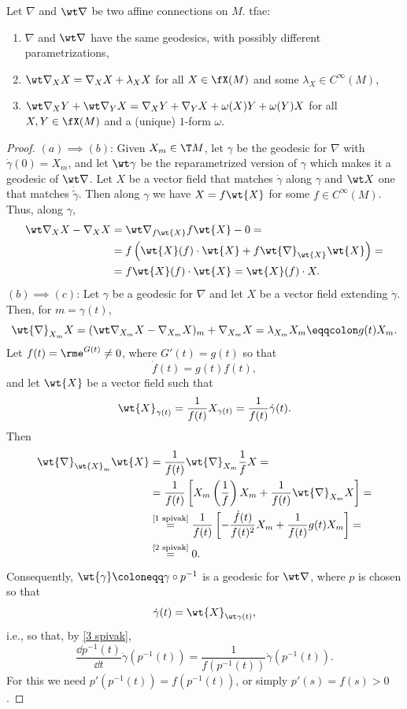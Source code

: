 \begin{prop}
    Let $\nabla$ and $\wt\nabla$ be two affine connections on $M$. \gls{tfae}:
    \begin{enumerate}[label=(\alph*)]
        \item $\nabla$ and $\wt\nabla$ have the same geodesics, with possibly different parametrizations,
        \item $\wt\nabla_X X=\nabla_X X+\lambda_X X$ for all $X\in \fX(M)$ and some $\lambda_X\in C^\infty(M)$,
        \item $\wt\nabla_X Y+\wt\nabla_Y X=\nabla_X Y+\nabla_Y X+\omega(X)Y+\omega(Y)X$ for all $X,Y\in\fX(M)$ and a (unique) $1$-form $\omega$.
    \end{enumerate}    
\end{prop}
\begin{proof}
    $(a)\implies(b)$: Given $X_m\in \T M$, let $\gamma$  be the geodesic for $\nabla$ with $\dot\gamma(0)=X_m$, and let $\wt\gamma$ be the reparametrized version of $\gamma$ which makes it a geodesic of $\wt\nabla$. Let $X$ be a vector field that matches $\dot\gamma$ along $\gamma$ and $\wt X$ one that matches $\dot{\tilde\gamma}$. Then along $\gamma$ we have $X=f\wt{X}$ for some $f\in C^\infty(M)$. Thus, along $\gamma$,
    \begin{align}
        \wt\nabla_X X-\nabla_X X&= \wt\nabla_{f\wt{X}}f\wt{X}-0=\notag\\
        &= f\left(\wt{X}(f)\cdot \wt{X}+f\wt{\nabla}_{\wt{X}}\wt{X}\right)=\notag\\
        &= f\wt{X}(f)\cdot \wt{X}=\wt{X}(f)\cdot X.
    \end{align}
    $(b)\implies(c)$: Let $\gamma$ be a geodesic for $\nabla$ and let $X$ be a vector field extending $\dot\gamma$. Then, for $m=\gamma(t)$,
    \[\wt{\nabla}_{X_m}X=(\wt\nabla_{X_m} X-\nabla_{X_m} X)_m+\nabla_{X_m}X=\lambda_{X_m}X_m\eqqcolon g(t)X_m.\label{1 spivak}\]
    Let $f(t)=\rme^{G(t)}\neq 0$, where $G'(t)=g(t)$ so that 
    \[\dot f(t)=g(t)f(t),\label{2 spivak}\] 
    and let $\wt{X}$ be a vector field such that 
    \[\wt{X}_{\gamma(t)}=\frac{1}{f(t)}X_{\gamma(t)}=\frac{1}{f(t)}\dot\gamma(t).\label{3 spivak}\]
    Then 
    \begin{align}
        \wt{\nabla}_{\wt{X}_m}\wt{X}&= \frac{1}{f(t)}\wt{\nabla}_{X_m}\frac{1}{f}X=\notag\\
        &= \frac{1}{f(t)}\left[X_m\left(\frac{1}{f}\right)X_m+\frac{1}{f(t)}\wt{\nabla}_{X_m}X\right]=\notag\\
        &\overset{\text{\eqref{1 spivak}}}{=}\frac{1}{f(t)}\left[-\frac{\dot f(t)}{f(t)^2}X_m+\frac{1}{f(t)}g(t)X_m\right]=\notag\\
        &\overset{\text{\eqref{2 spivak}}}{=} 0.
    \end{align}
    Consequently, $\wt{\gamma}\coloneqq \gamma\circ p^{-1}$ is a geodesic for $\wt\nabla$, where $p$ is chosen so that 
    \[\dot\gamma(t)=\wt{X}_{\wt\gamma(t)},\]
    i.e., so that, by \eqref{3 spivak},
    \[\frac{\dd p^{-1}(t)}{\dd t}\dot\gamma(p^{-1}(t))=\frac{1}{f(p^{-1}(t))}\dot\gamma(p^{-1}(t)).\]
    For this we need $p'(p^{-1}(t))=f(p^{-1}(t))$, or simply $p'(s)=f(s)>0$.


\end{proof}
